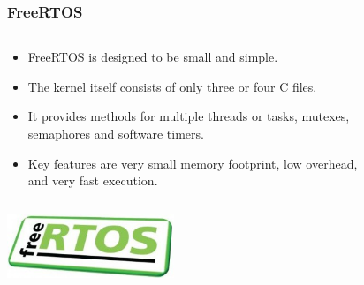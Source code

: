 \documentclass{beamer}
\begin{document}
\begin{frame}
	\frametitle{FreeRTOS}
	\begin{columns}[c]
		\begin{column}{30cm}
			\vspace{.1cm}
			\begin{itemize}
				\justifying
				\item FreeRTOS is designed to be \textcolor{TextOrange}{small}
				and \textcolor{TextOrange}{simple}.
				\item The kernel itself consists of only three or four C files.
				\item It provides methods for multiple threads or tasks, mutexes,\\
				semaphores and software timers.
				\item Key features are \textcolor{TextGreen}{very small memory footprint},
				\textcolor{TextGreen}{low overhead},\\
				and \textcolor{TextGreen}{very fast execution}.
			\end{itemize}
		\end{column}
	\end{columns}
	\vspace{.5cm}
	\hspace*{5.5cm} \includegraphics[width=5cm]{figs/freertos-logo.jpg}	
\end{frame}
\end{document}
